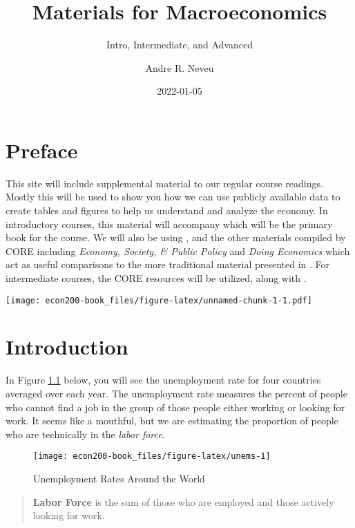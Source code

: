 \documentclass[
]{book}
\title{Materials for Macroeconomics}
\subtitle{Intro, Intermediate, and Advanced}
\author{Andre R. Neveu}
\date{2022-01-05}
\begin{document}
\maketitle

{
\setcounter{tocdepth}{1}
\tableofcontents
}
\hypertarget{preface}{%
\chapter*{Preface}\label{preface}}

This site will include supplemental material to our regular course readings. Mostly this will be used to show you how we can use publicly available data to create tables and figures to help us understand and analyze the economy. In introductory courses, this material will accompany \citet{tw} which will be the primary book for the course. We will also be using \citet{core}, and the other materials compiled by CORE including \emph{Economy, Society, \& Public Policy} \citep{espp} and \emph{Doing Economics} \citep{doing} which act as useful comparisons to the more traditional material presented in \citet{tw}. For intermediate courses, the CORE resources will be utilized, along with \citet{jones}.

\texttt{[image: econ200-book\_files/figure-latex/unnamed-chunk-1-1.pdf]}

\hypertarget{intro}{%
\chapter{Introduction}\label{intro}}

In Figure \ref{fig:unems} below, you will see the unemployment rate for four countries averaged over each year. The unemployment rate measures the percent of people who cannot find a job in the group of those people either working or looking for work. It seems like a mouthful, but we are estimating the proportion of people who are technically in the \emph{labor force}.

\begin{figure}

{\centering \texttt{[image: econ200-book\_files/figure-latex/unems-1]} 

}

\caption{Unemployment Rates Around the World}\label{fig:unems}
\end{figure}

\begin{quote}
\textbf{Labor Force} is the sum of those who are employed and those actively looking for work.
\end{quote}
\end{document}
